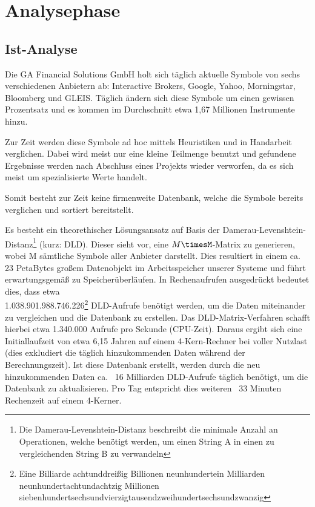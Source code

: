 \section{Analysephase}
\label{section:analysephase}
\subsection{Ist-Analyse}
Die GA Financial Solutions GmbH holt sich täglich aktuelle Symbole von sechs verschiedenen
Anbietern ab: Interactive Brokers, Google, Yahoo, Morningstar, Bloomberg und GLEIS.
Täglich ändern sich diese Symbole um einen gewissen Prozentsatz und es kommen im Durchschnitt etwa 1,67 Millionen Instrumente hinzu.\par

Zur Zeit werden diese Symbole ad hoc mittels Heuristiken und in Handarbeit verglichen.
Dabei wird meist nur eine kleine Teilmenge benutzt und gefundene Ergebnisse werden
nach Abschluss eines Projekts wieder verworfen, da es sich meist um spezialisierte Werte handelt.\par

Somit besteht zur Zeit keine firmenweite Datenbank, welche die Symbole
bereits verglichen und sortiert bereitstellt.\par

Es besteht ein theorethischer Lösungsansatz auf Basis der Damerau-Levenshtein-Distanz\footnote{Die Damerau-Levenshtein-Distanz\cite{dl_distance} beschreibt die minimale Anzahl
	an Operationen, welche benötigt werden, um einen String A in einen zu
	vergleichenden String B zu verwandeln} (kurz: DLD). Dieser sieht vor, eine $M\timesM$-Matrix zu generieren, wobei M sämtliche Symbole aller
Anbieter darstellt. Dies resultiert in einem ca. 23 PetaBytes großem Datenobjekt
im Arbeitsspeicher unserer Systeme und führt erwartungsgemäß zu Speicherüberläufen.
In Rechenaufrufen ausgedrückt bedeutet dies, dass etwa \\
1.038.901.988.746.226\footnote{Eine Billiarde achtunddreißig Billionen neunhundertein Milliarden neunhundertachtundachtzig Millionen siebenhundertsechsundvierzigtausendzweihundertsechsundzwanzig} DLD-Aufrufe benötigt werden, um die Daten miteinander
zu vergleichen und die Datenbank zu erstellen. Das DLD-Matrix-Verfahren schafft hierbei 
etwa 1.340.000 Aufrufe pro Sekunde (CPU-Zeit).
Daraus ergibt sich eine Initiallaufzeit von etwa 6,15 Jahren auf einem 4-Kern-Rechner bei voller Nutzlast (dies exkludiert die täglich hinzukommenden Daten
während der Berechnungszeit). Ist diese Datenbank erstellt, werden durch die neu
hinzukommenden Daten ca. ~16 Milliarden DLD-Aufrufe täglich benötigt, um die
Datenbank zu aktualisieren. Pro Tag entspricht dies weiteren ~33 Minuten Rechenzeit auf
einem 4-Kerner.\par

